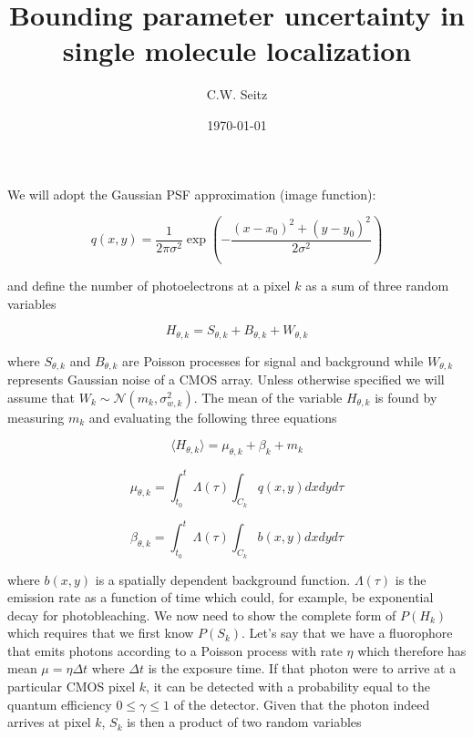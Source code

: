 \documentclass{article}
\title{Bounding parameter uncertainty in single molecule localization}
\author{C.W. Seitz}
\date{\today}
\begin{document}
\maketitle

We will adopt the Gaussian PSF approximation (image function):

\begin{equation*}
q(x,y) = \frac{1}{2\pi\sigma^{2}}\exp\left(-\frac{(x-x_{0})^{2}+(y-y_{0})^{2}}{2\sigma^{2}}\right)
\end{equation*}

and define the number of photoelectrons at a pixel $k$ as a sum of three random variables

\begin{equation*}
H_{\theta,k} = S_{\theta,k} + B_{\theta,k} + W_{\theta,k}
\end{equation*}

where $S_{\theta,k}$ and $B_{\theta,k}$ are Poisson processes for signal and background while $W_{\theta,k}$ represents Gaussian noise of a CMOS array. Unless otherwise specified we will assume that $W_{k} \sim \mathcal{N}(m_{k},\sigma_{w,k}^{2})$. The mean of the variable $H_{\theta,k}$ is found by measuring $m_{k}$ and evaluating the following three equations

\begin{equation*}
\langle H_{\theta,k} \rangle = \mu_{\theta,k} + \beta_{k} + m_{k}
\end{equation*}

\begin{equation*}
\mu_{\theta,k} = \int_{t_{0}}^{t} \Lambda(\tau) \int_{C_{k}} q(x,y)dxdyd\tau
\end{equation*}

\begin{equation*}
\beta_{\theta,k} = \int_{t_{0}}^{t} \Lambda(\tau) \int_{C_{k}} b(x,y)dxdyd\tau
\end{equation*}

where $b(x,y)$ is a spatially dependent background function. $\Lambda(\tau)$ is the emission rate as a function of time which could, for example, be exponential decay for photobleaching. We now need to show the complete form of $P(H_{k})$ which requires that we first know $P(S_{k})$. Let's say that we have a fluorophore that emits photons according to a Poisson process with rate $\eta$ which therefore has mean $\mu = \eta\Delta t$ where $\Delta t$ is the exposure time. If that photon were to arrive at a particular CMOS pixel $k$, it can be detected with a probability equal to the quantum efficiency $0 \leq \gamma \leq 1$ of the detector. Given that the photon indeed arrives at pixel $k$, $S_{k}$ is then a product of two random variables
\end{document}
